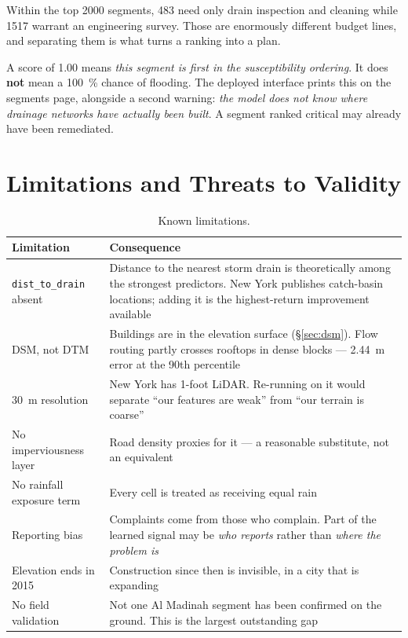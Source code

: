 \documentclass[11pt,a4paper]{article}
\newcommand{\ttt}[1]{\texttt{#1}}
\begin{document}
Within the top \num{2000} segments, 483 need only drain inspection and cleaning while
\num{1517} warrant an engineering survey. Those are enormously different budget lines, and
separating them is what turns a ranking into a plan.

\begin{trapbox}
A score of \num{1.00} means \emph{this segment is first in the susceptibility ordering}.
It does \textbf{not} mean a \SI{100}{\percent} chance of flooding. The deployed interface
prints this on the segments page, alongside a second warning: \emph{the model does not
know where drainage networks have actually been built}. A segment ranked critical may
already have been remediated.
\end{trapbox}

\section{Limitations and Threats to Validity}\label{sec:limits}

\begin{table}[htbp]\centering\small
\caption{Known limitations.}\label{tab:limits}
\begin{tabular}{@{}p{4.2cm}p{8.4cm}@{}}
\toprule
Limitation & Consequence\\
\midrule
\rowcolor{rowtint}
\ttt{dist\_to\_drain} absent & Distance to the nearest storm drain is theoretically among
  the strongest predictors. New York publishes catch-basin locations; adding it is the
  highest-return improvement available\\
\rowcolor{rowtint}
DSM, not DTM & Buildings are in the elevation surface (\S\ref{sec:dsm}). Flow routing
  partly crosses rooftops in dense blocks --- \SI{2.44}{\metre} error at the 90th
  percentile\\
\SI{30}{\metre} resolution & New York has 1-foot LiDAR. Re-running on it would separate
  ``our features are weak'' from ``our terrain is coarse''\\
No imperviousness layer & Road density proxies for it --- a reasonable substitute, not an
  equivalent\\
No rainfall exposure term & Every cell is treated as receiving equal rain\\
\rowcolor{rowtint}
Reporting bias & Complaints come from those who complain. Part of the learned signal may
  be \emph{who reports} rather than \emph{where the problem is}\\
Elevation ends in 2015 & Construction since then is invisible, in a city that is expanding\\
\rowcolor{rowtint}
No field validation & Not one Al Madinah segment has been confirmed on the ground. This is
  the largest outstanding gap\\
\bottomrule
\end{tabular}
\end{table}
\end{document}
